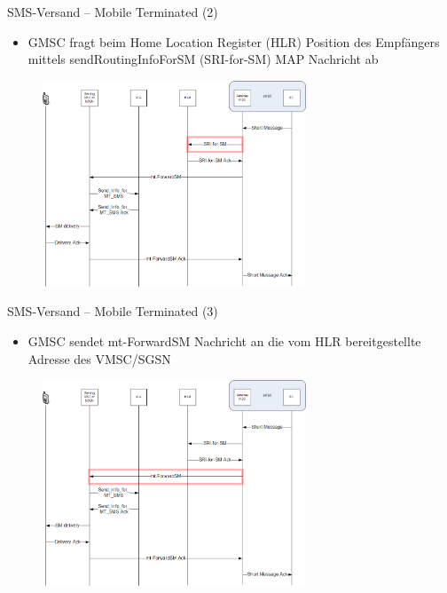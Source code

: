 \documentclass{beamer}
\begin{document}
\begin{frame}{SMS-Versand -- Mobile Terminated (2)}

	\begin{itemize}
		\item GMSC fragt beim Home Location Register (HLR) Position des 
			Empfängers mittels sendRoutingInfoForSM (SRI-for-SM) MAP Nachricht ab 
	\end{itemize}
	\begin{figure}[htm]
		\includegraphics[width=0.7\textwidth]{img/mt-forward-sm-2.png}
	\end{figure}
\end{frame}

\begin{frame}{SMS-Versand -- Mobile Terminated (3)}

	\begin{itemize}
		\item GMSC sendet mt-ForwardSM Nachricht an die vom HLR bereitgestellte 
			Adresse des VMSC/SGSN
	\end{itemize}
	\begin{figure}[htm]
		\includegraphics[width=0.7\textwidth]{img/mt-forward-sm-3.png}
	\end{figure}
\end{frame}
\end{document}
